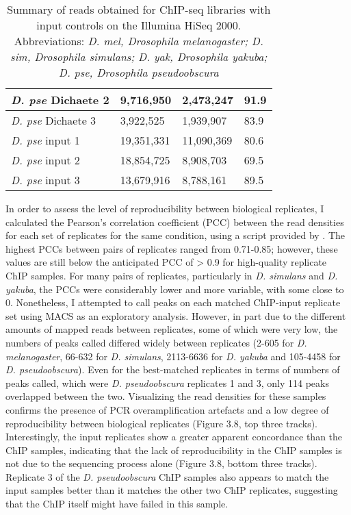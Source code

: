 \begin{table}[h]
\begin{tabular}{|l|l|l|l|}
\emph{D. pse} Dichaete 2 & 9,716,950   & 2,473,247    & 91.9               \\ \hline
\emph{D. pse} Dichaete 3 & 3,922,525   & 1,939,907    & 83.9               \\ \hline
\emph{D. pse} input 1    & 19,351,331  & 11,090,369   & 80.6               \\ \hline
\emph{D. pse} input 2    & 18,854,725  & 8,908,703    & 69.5               \\ \hline
\emph{D. pse} input 3    & 13,679,916  & 8,788,161    & 89.5               \\ \hline
\end{tabular}
\caption{Summary of reads obtained for ChIP-seq libraries with input controls on the Illumina HiSeq 2000. Abbreviations: \emph{D. mel, Drosophila melanogaster; D. sim, Drosophila simulans; D. yak, Drosophila yakuba; D. pse, Drosophila pseudoobscura}}
\label{Table 3.3}
\end{table}

In order to assess the level of reproducibility between biological replicates, I calculated the Pearson’s correlation coefficient (PCC) between the read densities for each set of replicates for the same condition, using a script provided by \citet{bardet_computational_2011}. The highest PCCs between pairs of replicates ranged from 0.71-0.85; however, these values are still below the anticipated PCC of > 0.9 for high-quality replicate ChIP samples. For many pairs of replicates, particularly in \emph{D. simulans} and \emph{D. yakuba}, the PCCs were considerably lower and more variable, with some close to 0. Nonetheless, I attempted to call peaks on each matched ChIP-input replicate set using MACS as an exploratory analysis. However, in part due to the different amounts of mapped reads between replicates, some of which were very low, the numbers of peaks called differed widely between replicates (2-605 for \emph{D. melanogaster}, 66-632 for \emph{D. simulans}, 2113-6636 for \emph{D. yakuba} and 105-4458 for \emph{D. pseudoobscura}). Even for the best-matched replicates in terms of numbers of peaks called, which were \emph{D. pseudoobscura} replicates 1 and 3, only 114 peaks overlapped between the two. Visualizing the read densities for these samples confirms the presence of PCR overamplification artefacts and a low degree of reproducibility between biological replicates (Figure 3.8, top three tracks). Interestingly, the input replicates show a greater apparent concordance than the ChIP samples, indicating that the lack of reproducibility in the ChIP samples is not due to the sequencing process alone (Figure 3.8, bottom three tracks). Replicate 3 of the \emph{D. pseudoobscura} ChIP samples also appears to match the input samples better than it matches the other two ChIP replicates, suggesting that the ChIP itself might have failed in this sample.

